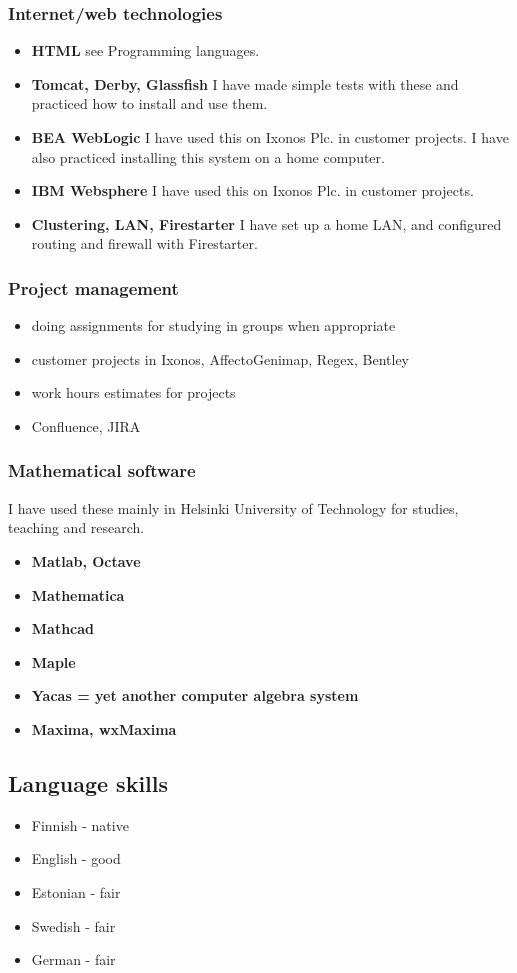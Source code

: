 \documentclass[a4paper,12pt]{article}
\begin{document}
\subsubsection*{Internet/web technologies}
\begin{itemize}
\item{\bf HTML}
see Programming languages.
\item{\bf Tomcat, Derby, Glassfish}
I have made simple tests with these and practiced how to install and use them.
\item{\bf BEA WebLogic}
I have used this on Ixonos Plc. in customer projects. I have also practiced installing
this system on a home computer.
\item{\bf IBM Websphere}
I have used this on Ixonos Plc. in customer projects.
\item{\bf Clustering, LAN, Firestarter}
I have set up a home LAN, and configured routing and firewall with Firestarter.
\end{itemize}

\subsubsection*{Project management}
\begin{itemize}
\item
doing assignments for studying in groups when appropriate
\item
customer projects in Ixonos, AffectoGenimap, Regex, Bentley
\item
work hours estimates for projects
\item
Confluence, JIRA
\end{itemize}

\subsubsection*{Mathematical software}
I have used these mainly in Helsinki University of Technology for studies, teaching
and research.
\begin{itemize}
\item
{\bf Matlab, Octave}
\item
{\bf Mathematica}
\item
{\bf Mathcad}
\item
{\bf Maple}
\item
{\bf Yacas = yet another computer algebra system}
\item
{\bf Maxima, wxMaxima}
\end{itemize}

\subsection*{Language skills}
\begin{itemize}
\item
Finnish - native
\item
English - good
\item
Estonian - fair
\item
Swedish - fair
\item
German - fair
\end{itemize}
\end{document}
